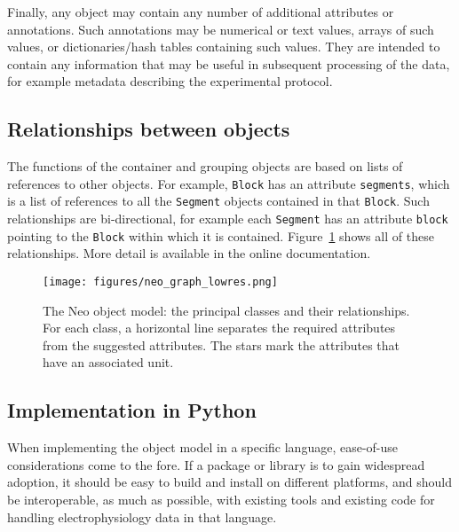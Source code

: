 \documentclass{frontiers}
\begin{document}
Finally, any object may contain any number of additional attributes or annotations.
Such annotations may be numerical or text values, arrays of such values, or dictionaries/hash tables containing such values.
They are intended to contain any information that may be useful in subsequent processing of the data, for example metadata describing the experimental protocol.


\subsection{Relationships between objects}

The functions of the container and grouping objects are based on lists of references to other objects.
For example, \lstinline`Block` has an attribute \lstinline`segments`, which is a list of references to all the \lstinline`Segment` objects contained in that \lstinline`Block`.
Such relationships are bi-directional, for example each \lstinline`Segment` has an attribute \lstinline`block` pointing to the \lstinline`Block` within which it is contained.
Figure~\ref{fig:relationships} shows all of these relationships.
More detail is available in the online documentation.

\begin{figure}
\centering
\texttt{[image: figures/neo\_graph\_lowres.png]}
\caption{The Neo object model: the principal classes and their relationships. For each class, a horizontal line separates the required attributes from the suggested attributes. The stars mark the attributes that have an associated unit.}\label{fig:relationships}
\end{figure}

\subsection{Implementation in Python}


When implementing the object model in a specific language, ease-of-use considerations come to the fore.
If a package or library is to gain widespread adoption, it should be easy to build and install on different platforms, and should be interoperable, as much as possible, with existing tools and existing code for handling electrophysiology data in that language.
\end{document}
